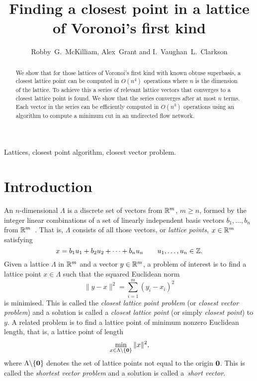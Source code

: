 \documentclass[final,leqno]{siamltex}
\title{Finding a closest point in a lattice of Voronoi's first kind}
\author{Robby~G.~McKilliam, Alex~Grant and I.~Vaughan~L.~Clarkson}
\begin{document}
\maketitle

 \begin{abstract} 
We show that for those lattices of Voronoi's first kind with known obtuse superbasis, a closest lattice point can be computed in $O(n^4)$ operations where $n$ is the dimension of the lattice.  To achieve this a series of relevant lattice vectors that converges to a closest lattice point is found.  We show that the series converges after at most $n$ terms.  Each vector in the series can be efficiently computed in $O(n^3)$ operations using an algorithm to compute a minimum cut in an undirected flow network.  %
\end{abstract}

\begin{keywords}
Lattices, closest point algorithm, closest vector problem.
\end{keywords}

\pagestyle{myheadings}
\thispagestyle{plain}


\section{Introduction}\label{sec:introduction}

An $n$-dimensional  $\Lambda$ is a discrete set of vectors from ${\mathbb R}^m$, $m \geq n$, formed by the integer linear combinations of a set of linearly independent basis vectors $b_1, \dots, b_n$ from ${\mathbb R}^m$~\cite{SPLAG}.  That is, $\Lambda$ consists of all those vectors, or \emph{lattice points}, $x \in {\mathbb R}^m$ satisfying
\[
  x = b_1 u_1 + b_2u_2 + \dots + b_n u_n \qquad u_1, \dots , u_n \in {\mathbb Z}. 
\] 
Given a lattice $\Lambda$ in ${\mathbb R}^m$ and a vector $y \in {\mathbb R}^m$, a problem of interest is to find a lattice point $x \in \Lambda$ such that the squared Euclidean norm
\[
\| y - x \|^2 = \sum_{i=1}^m (y_i - x_i)^2
\] 
is minimised.  This is called the \emph{closest lattice point problem} (or \emph{closest vector problem}) and a solution is called a \emph{closest lattice point} (or simply \emph{closest point}) to $y$. %
A related problem is to find a lattice point of minimum nonzero Euclidean length, that is, a lattice point of length
\[
\min_{x\in \Lambda \backslash \{ \boldsymbol{0} \} } \| x \|^2,
\]
where $\Lambda \backslash  \{\boldsymbol{0}\}$ denotes the set of lattice points not equal to the origin $\boldsymbol{0}$.  This is called the \emph{shortest vector problem} and a solution is called a~\emph{short vector}.
\end{document}
